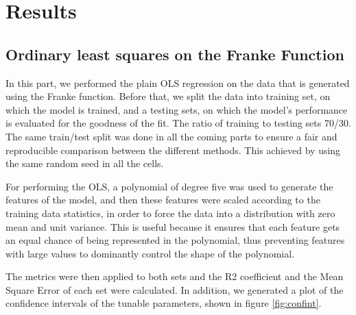 \documentclass{article}
\begin{document}
\section{Results}
\subsection{Ordinary least squares on the Franke Function}
In this part, we performed the plain OLS regression on the data that is generated using the Franke function. Before that, we split the data into training set, on which the model is trained, and a testing sets, on which the model’s performance is evaluated for the goodness of the fit. The ratio of training to testing sets 70/30. The same train/test split was done in all the coming parts to ensure a fair and reproducible comparison between the different methods. This achieved by using the same random seed in all the cells.

For performing the OLS, a polynomial of degree five was used to generate the features of the model, and then these features were scaled according to the training data statistics, in order to force the data into a distribution with zero mean and unit variance. This is useful because it ensures that each feature gets an equal chance of being represented in the polynomial, thus preventing features with large values to dominantly control the shape of the polynomial.

The metrics were then applied to both sets and the R2 coefficient and the Mean Square Error of each set were calculated. In addition, we generated a plot of the confidence intervals of the tunable parameters, shown in figure \ref{fig:confint}.
\end{document}

